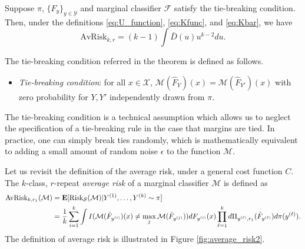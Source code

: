 \begin{theorem}\label{theorem:avrisk_identity}
Suppose $\pi$, $\{F_y\}_{y \in \mathcal{Y}}$ and marginal classifier
$\mathcal{F}$ satisfy the tie-breaking condition.  Then, under the
definitions \eqref{eq:U_function}, \eqref{eq:Kfunc},
and \eqref{eq:Kbar}, we have
\begin{equation}\label{eq:avrisk_identity}
\text{AvRisk}_{k, r} = (k-1) \int \bar{D}(u) u^{k-2} du.
\end{equation}
\end{theorem}

The tie-breaking condition referred in the theorem is defined as follows.
\begin{itemize}
\item 
\emph{Tie-breaking condition}: for all $x \in \mathcal{X}$,
$\mathcal{M}(\hat{F}_Y)(x) = \mathcal{M}(\hat{F}_{Y'})(x)$
with zero probability for $Y, Y'$ independently drawn from $\pi$.
\end{itemize}
The tie-breaking condition is a technical assumption which allows us
to neglect the specification of a tie-breaking rule in the case that
margins are tied.  In practice, one can simply break ties randomly,
which is mathematically equivalent to adding a small amount of random
noise $\epsilon$ to the function $\mathcal{M}$.

Let us revisit the definition of the average risk, under a general
cost function $C$.  The $k$-class, $r$-repeat \emph{average risk} of a
marginal classifier $\mathcal{M}$ is defined as
\begin{align*}
\text{AvRisk}_{k,r_1}(\mathcal{M}) &= \textbf{E}[\text{Risk}_{\mathcal{S}}(\mathcal{M})|Y^{(1)}, \hdots, Y^{(k)} \sim \pi]
\\&= \frac{1}{k} \sum_{i=1}^k \int
I(\mathcal{M}(\hat{F}_{y^{(i)}})(x) \neq \max_j
\mathcal{M}(\hat{F}_{y^{(j)}})) dF_{y^{(i)}}(x) \prod_{\ell=1}^k
d\Pi_{y^{(\ell)}, r_1}(\hat{F}_{y^{(\ell)}}) d\pi(y^{(\ell)}).
\end{align*}
The definition of average risk is illustrated in Figure \ref{fig:average_risk2}.

